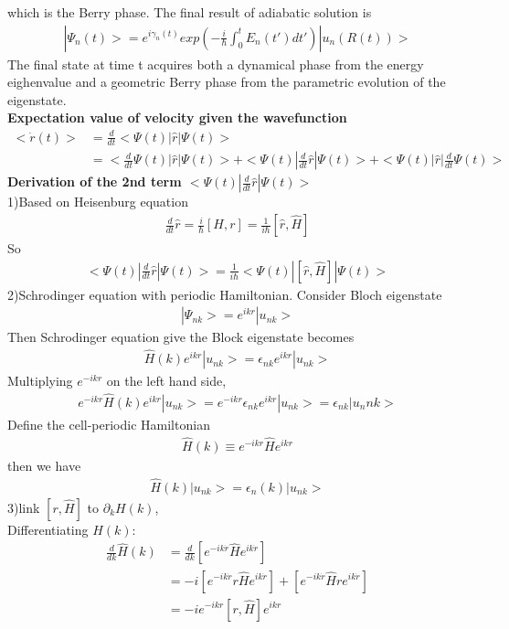 \documentclass[a4paper]{article}
\begin{document}
which is the Berry phase.
The final result of adiabatic solution is
\begin{align*}
|\Psi_n(t)> = e^{i \gamma_n(t)} exp(-\frac{i}{\hbar} \int_0^t E_n(t')dt')|u_n(R(t))>
\end{align*}
The final state at time t acquires both a dynamical phase from the energy eighenvalue and a geometric Berry phase from the parametric evolution of the eigenstate.\\
{\bf Expectation value of velocity given the wavefunction}
\begin{align*}
<\dot r(t)> & = \frac{d}{dt}<\Psi(t)|\hat r|\Psi(t)>\\
                 & = <\frac{d}{dt}\Psi(t)|\hat r| \Psi(t)> + <\Psi(t)|\frac{d}{dt}\hat r|\Psi(t)> +  <\Psi(t)|\hat r| \frac{d}{dt}\Psi(t)>
\end{align*}
{\bf Derivation of the 2nd term $<\Psi(t)|\frac{d}{dt}\hat r|\Psi(t)>$ }\\
1)Based on Heisenburg equation
\begin{align*}
\frac{d}{dt} \hat r = \frac{i}{\hbar}[H, r] = \frac{1}{i\hbar}[\hat r, \hat H]
\end{align*}
So
\begin{align*}
<\Psi(t)|\frac{d}{dt}\hat r|\Psi(t)> = \frac{1}{i\hbar}<\Psi(t)|[\hat r,\hat H]|\Psi(t)>
\end{align*}
2)Schrodinger equation with periodic Hamiltonian.
Consider Bloch eigenstate
\begin{align*}
|\Psi_{nk}> = e^{ikr} |u_{nk}> 
\end{align*}
Then Schrodinger equation give the Block eigenstate becomes
\begin{align*}
\hat H(k) e^{ikr} |u_{nk}> = \epsilon_{nk} e^{ikr}|u_{nk}>
\end{align*}
Multiplying $e^{-ikr}$ on the left hand side,
\begin{align*}
e^{-ikr}\hat H(k) e^{ikr} |u_{nk}> = e^{-ikr}\epsilon_{nk} e^{ikr}|u_{nk}> = \epsilon_{nk} |u_n{nk}>
\end{align*}
Define the cell-periodic Hamiltonian
\begin{align*}
\hat H(k) \equiv e^{-ikr} \hat H e^{ikr}
\end{align*}
then we have
\begin{align*}
\hat H(k) |u_{nk}> = \epsilon_n(k) |u_{nk}>
\end{align*}
3)link $[r, \hat H]$ to $\partial_k H(k)$,\\  
Differentiating $\hat H(k)$:
\begin{align*}
\frac{d}{dk}\hat H(k) & = \frac{d}{dk}[e^{-ik\dot r} \hat H e^{ik \dot r}] \\
& = -i[e^{-ik\dot r} r\hat H e^{ik \dot r}] + [e^{-ik\dot r} \hat H  r e^{ik \dot r}] \\
& = -ie^{-ikr} [r, \hat H]e^{ikr}
\end{align*}
\end{document}
